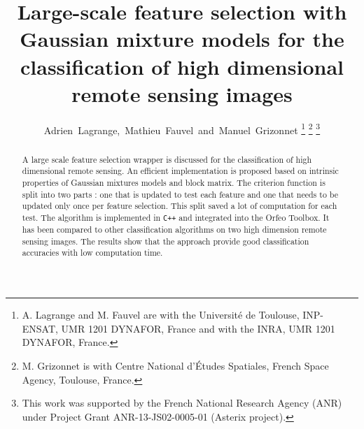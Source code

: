 \documentclass[journal,peerreview,onecolumn]{IEEEtran}
\begin{document}
%
\title{Large-scale feature selection with Gaussian mixture models for the classification of high dimensional remote sensing images}
%
%
%

\author{Adrien~Lagrange,~Mathieu~Fauvel~and~Manuel~Grizonnet%
\thanks{A. Lagrange and M. Fauvel are with the Universit\'{e} de Toulouse,
INP-ENSAT, UMR 1201 DYNAFOR, France and with the INRA, UMR 1201
DYNAFOR, France.}%
\thanks{M. Grizonnet is with Centre National d'\'{E}tudes Spatiales, French Space Agency, Toulouse, France.}%
\thanks{This  work was  supported  by the  French National  Research Agency  (ANR)  under  Project Grant  ANR-13-JS02-0005-01  (Asterix project).}}


\maketitle

\begin{abstract}
  A  large  scale  feature  selection wrapper  is  discussed  for  the
  classification  of high  dimensional  remote  sensing. An  efficient
  implementation is proposed based on intrinsic properties of Gaussian
  mixtures models and  block matrix.  The criterion  function is split
  into two parts  : one that is  updated to test each  feature and one
  that needs to be updated only once per feature selection. This split
  saved  a  lot  of  computation  for each  test.   The  algorithm  is
  implemented in  \texttt{C++} and integrated into  the Orfeo Toolbox.
  It has been compared to  other classification algorithms on two high
  dimension remote sensing images. The  results show that the approach
  provide good classification accuracies with low computation time.
\end{abstract}
\end{document}
